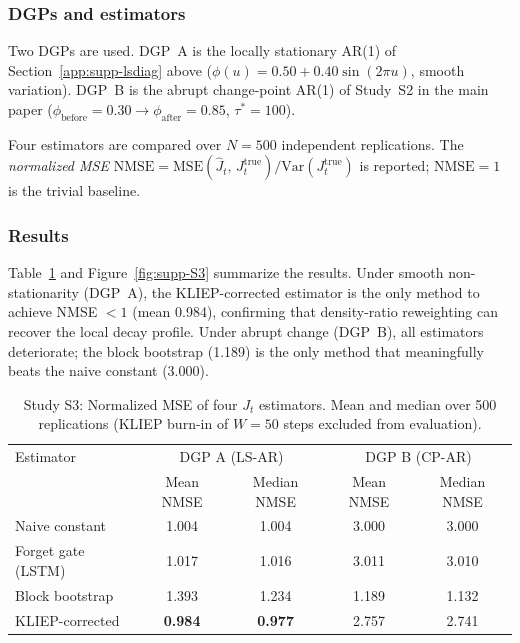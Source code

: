 \documentclass[bj,authoryear]{imsart}
\theoremstyle{plain}
\theoremstyle{definition}
\begin{document}
\subsubsection*{DGPs and estimators}

Two DGPs are used.
DGP~A is the locally stationary AR(1) of Section~\ref{app:supp-lsdiag} above
($\phi(u) = 0.50 + 0.40\sin(2\pi u)$, smooth variation).
DGP~B is the abrupt change-point AR(1) of Study~S2 in the main paper
($\phi_{\mathrm{before}} = 0.30 \to \phi_{\mathrm{after}} = 0.85$, $\tau^* = 100$).

Four estimators are compared over $N = 500$ independent replications.
The \emph{normalized MSE}
$\mathrm{NMSE} = \mathrm{MSE}(\hat J_t,\,J_t^{\mathrm{true}}) / \mathrm{Var}(J_t^{\mathrm{true}})$
is reported; $\mathrm{NMSE} = 1$ is the trivial baseline.

\subsubsection*{Results}

Table~\ref{tab:supp-S3} and Figure~\ref{fig:supp-S3} summarize the results.
Under smooth non-stationarity (DGP~A), the KLIEP-corrected estimator is the
only method to achieve NMSE $< 1$ (mean 0.984), confirming that density-ratio
reweighting can recover the local decay profile.
Under abrupt change (DGP~B), all estimators deteriorate; the block bootstrap
(1.189) is the only method that meaningfully beats the naive constant (3.000).

\begin{table}[ht]
\centering
\caption{Study S3: Normalized MSE of four $J_t$ estimators.
  Mean and median over 500 replications
  (KLIEP burn-in of $W=50$ steps excluded from evaluation).}
\label{tab:supp-S3}
\begin{tabular}{lcccc}
\toprule
Estimator & \multicolumn{2}{c}{DGP A (LS-AR)} &
            \multicolumn{2}{c}{DGP B (CP-AR)} \\
          & Mean NMSE & Median NMSE & Mean NMSE & Median NMSE \\
\midrule
Naive constant       & 1.004 & 1.004 & 3.000 & 3.000 \\
Forget gate (LSTM)   & 1.017 & 1.016 & 3.011 & 3.010 \\
Block bootstrap      & 1.393 & 1.234 & 1.189 & 1.132 \\
KLIEP-corrected      & \textbf{0.984} & \textbf{0.977} & 2.757 & 2.741 \\
\bottomrule
\end{tabular}
\end{table}
\end{document}
